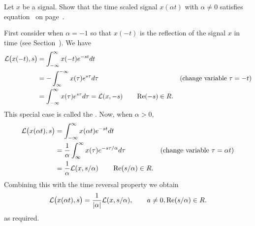 \begin{excersizelist}
\item \label{excer:timescalelaplace} Let $x$ be a signal.  Show that the time scaled signal $x(\alpha t)$ with $\alpha \neq 0$ satisfies equation~ on page~.
\begin{solution}
First consider when $\alpha = -1$ so that $x(-t)$ is the reflection of the signal $x$ in time (see Section~).  We have 
\begin{align*}
 \mathcal L\big( x(-t), s \big) &=  \int_{-\infty}^{\infty} x(-t)  e^{-s t} dt \\
 &=  -\int_{\infty}^{-\infty} x(\tau)  e^{s\tau} d\tau & \text{(change variable $\tau = -t$)}\\
 &=  \int_{-\infty}^{\infty} x(\tau)  e^{ s \tau} d\tau = \mathcal L(x, -s) \qquad \operatorname{Re}(-s) \in R.
 \end{align*}
 This special case is called the .  Now, when $\alpha > 0$,
 \begin{align*}
 \mathcal L\big( x(\alpha t), s \big) &=  \int_{-\infty}^{\infty} x(\alpha t)  e^{-s t} dt \\
 &=  \frac{1}{\alpha} \int_{\infty}^{\infty} x(\tau)  e^{-s \tau / \alpha}  d\tau & \text{(change variable $\tau = \alpha t$)}\\
 &= \frac{1}{\alpha} \mathcal L(x, s / \alpha) \qquad \operatorname{Re}(s/\alpha) \in R.
 \end{align*}
Combining this with the time reversal property we obtain
 \[
 \mathcal L\big(x(\alpha t),s\big) = \frac{1}{\left\vert \alpha \right\vert} \mathcal L(x, s/\alpha), \qquad a \neq 0, \operatorname{Re}(s/\alpha) \in R.
 \]
as required.
\end{solution}


\end{excersizelist}
